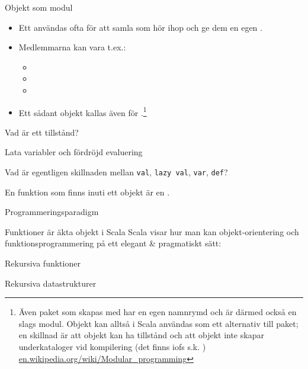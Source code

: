 \begin{Slide}{Objekt som modul}
\begin{itemize}
\item Ett  användas ofta för att samla  som hör ihop och ge dem en egen . 
\item Medlemmarna kan vara t.ex.: 
\begin{itemize}
\item  {} \item {} \item {} 
\end{itemize}
\item Ett sådant objekt kallas även för .\footnote{
Även paket som skapas med  har en egen namnrymd och är därmed också en slags modul. Objekt kan alltså i Scala användas som ett alternativ till paket; en skillnad är att objekt kan ha tillstånd och att objekt inte skapar underkataloger vid kompilering (det finns iofs s.k. ) \href{https://en.wikipedia.org/wiki/Modular_programming}{en.wikipedia.org/wiki/Modular\_programming}}

\end{itemize}

\end{Slide}


\begin{Slide}{Vad är ett tillstånd?} 
\end{Slide} 

\begin{Slide}{Lata variabler och fördröjd evaluering} 
\end{Slide} 

\begin{Slide}{Vad är egentligen skillnaden mellan \texttt{val}, \texttt{lazy val}, \texttt{var}, \texttt{def}?} 

En funktion som finns inuti ett objekt är en .
\end{Slide} 



\begin{Slide}{Programmeringsparadigm}
\end{Slide} 


\begin{Slide}{Funktioner är äkta objekt i Scala}
Scala visar hur man kan   objekt-orientering och funktionsprogrammering på ett elegant \& pragmatiskt sätt: \\\vspace{2em}


\end{Slide} 



\begin{Slide}{Rekursiva funktioner}
\end{Slide} 

\begin{Slide}{Rekursiva datastrukturer}
\end{Slide} 

